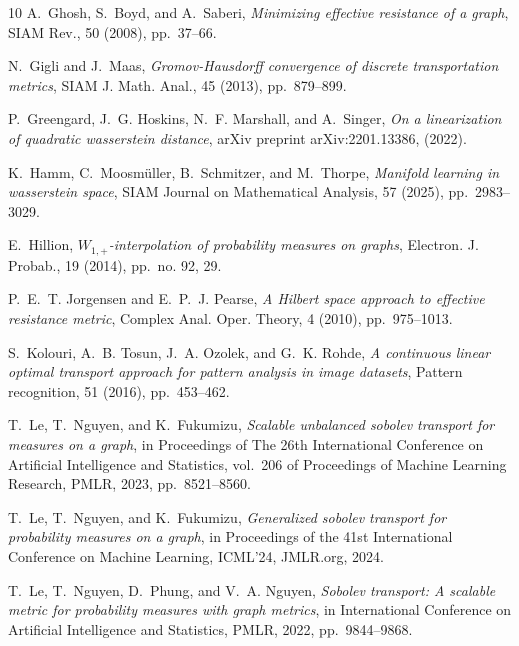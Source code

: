 \documentclass[11pt,a4paper]{article}
\begin{document}
\begin{thebibliography}{10}
    {\sc A.~Ghosh, S.~Boyd, and A.~Saberi}, {\em Minimizing effective resistance of a graph}, SIAM Rev., 50 (2008), pp.~37--66.

    {\sc N.~Gigli and J.~Maas}, {\em Gromov-{H}ausdorff convergence of discrete transportation metrics}, SIAM J. Math. Anal., 45 (2013), pp.~879--899.

    {\sc P.~Greengard, J.~G. Hoskins, N.~F. Marshall, and A.~Singer}, {\em On a linearization of quadratic wasserstein distance}, arXiv preprint arXiv:2201.13386,  (2022).

    {\sc K.~Hamm, C.~Moosm{\"u}ller, B.~Schmitzer, and M.~Thorpe}, {\em Manifold learning in wasserstein space}, SIAM Journal on Mathematical Analysis, 57 (2025), pp.~2983--3029.

    {\sc E.~Hillion}, {\em {$W_{1,+}$}-interpolation of probability measures on graphs}, Electron. J. Probab., 19 (2014), pp.~no. 92, 29.

    {\sc P.~E.~T. Jorgensen and E.~P.~J. Pearse}, {\em A {H}ilbert space approach to effective resistance metric}, Complex Anal. Oper. Theory, 4 (2010), pp.~975--1013.

    {\sc S.~Kolouri, A.~B. Tosun, J.~A. Ozolek, and G.~K. Rohde}, {\em A continuous linear optimal transport approach for pattern analysis in image datasets}, Pattern recognition, 51 (2016), pp.~453--462.

    {\sc T.~Le, T.~Nguyen, and K.~Fukumizu}, {\em Scalable unbalanced sobolev transport for measures on a graph}, in Proceedings of The 26th International Conference on Artificial Intelligence and Statistics, vol.~206 of Proceedings of Machine Learning Research, PMLR, 2023, pp.~8521--8560.

    {\sc T.~Le, T.~Nguyen, and K.~Fukumizu}, {\em Generalized sobolev transport for probability measures on a graph}, in Proceedings of the 41st International Conference on Machine Learning, ICML'24, JMLR.org, 2024.

    {\sc T.~Le, T.~Nguyen, D.~Phung, and V.~A. Nguyen}, {\em Sobolev transport: A scalable metric for probability measures with graph metrics}, in International Conference on Artificial Intelligence and Statistics, PMLR, 2022, pp.~9844--9868.


\end{thebibliography}
\end{document}
